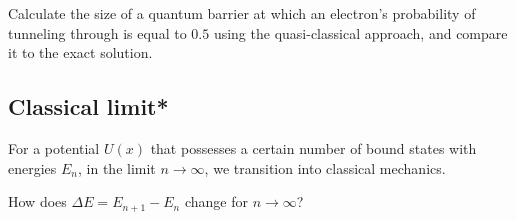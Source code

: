			Calculate the size of a quantum barrier at which an electron's probability of tunneling through is equal to $0.5$ using the quasi-classical approach, and compare it to the exact solution.
		
		\subsection{Classical limit*}	
			For a potential $U(x)$ that possesses a certain number of bound states with energies $E_n$, in the limit $n\rightarrow\infty$, we transition into classical mechanics. 
			
			How does $\Delta E = E_{n+1}-E_n$ change for $n\rightarrow\infty$?
